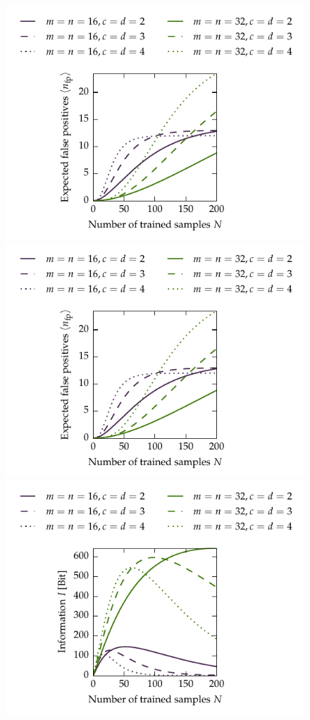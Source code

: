 \begin{figure}
	\centering
	\includegraphics[trim=0cm 5.5cm 0cm 0cm,clip]{media/chp3/expected_err.pdf}\\
	\includegraphics[trim=1.5cm 0cm 2.5cm 2cm,clip]{media/chp3/expected_err.pdf}
	\includegraphics[trim=1.5cm 0cm 2.5cm 2cm,clip]{media/chp3/expected_info.pdf}

\end{figure}
